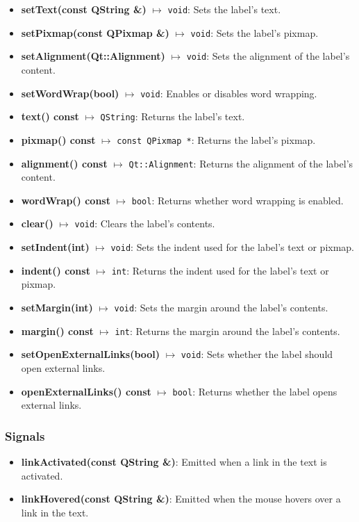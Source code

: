 \documentclass{report}
\begin{document}
    \pagebreak 


    \begin{itemize}
        \item \textbf{setText(const QString \&)} $\mapsto$ \texttt{void}: Sets the label's text.
        \item \textbf{setPixmap(const QPixmap \&)} $\mapsto$ \texttt{void}: Sets the label's pixmap.
        \item \textbf{setAlignment(Qt::Alignment)} $\mapsto$ \texttt{void}: Sets the alignment of the label's content.
        \item \textbf{setWordWrap(bool)} $\mapsto$ \texttt{void}: Enables or disables word wrapping.
        \item \textbf{text() const} $\mapsto$ \texttt{QString}: Returns the label's text.
        \item \textbf{pixmap() const} $\mapsto$ \texttt{const QPixmap *}: Returns the label's pixmap.
        \item \textbf{alignment() const} $\mapsto$ \texttt{Qt::Alignment}: Returns the alignment of the label's content.
        \item \textbf{wordWrap() const} $\mapsto$ \texttt{bool}: Returns whether word wrapping is enabled.
        \item \textbf{clear()} $\mapsto$ \texttt{void}: Clears the label's contents.
        \item \textbf{setIndent(int)} $\mapsto$ \texttt{void}: Sets the indent used for the label's text or pixmap.
        \item \textbf{indent() const} $\mapsto$ \texttt{int}: Returns the indent used for the label's text or pixmap.
        \item \textbf{setMargin(int)} $\mapsto$ \texttt{void}: Sets the margin around the label's contents.
        \item \textbf{margin() const} $\mapsto$ \texttt{int}: Returns the margin around the label's contents.
        \item \textbf{setOpenExternalLinks(bool)} $\mapsto$ \texttt{void}: Sets whether the label should open external links.
        \item \textbf{openExternalLinks() const} $\mapsto$ \texttt{bool}: Returns whether the label opens external links.
    \end{itemize}

    \subsubsection{Signals}
    \begin{itemize}
        \item \textbf{linkActivated(const QString \&)}: Emitted when a link in the text is activated.
        \item \textbf{linkHovered(const QString \&)}: Emitted when the mouse hovers over a link in the text.
    \end{itemize}
\end{document}
